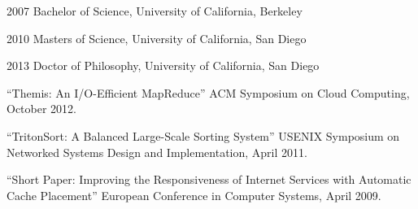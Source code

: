 \begin{vita}
\noindent
\begin{cv}{}
\begin{cvlist}{}
\item[2007] Bachelor of Science, University of California, Berkeley
\item[2010] Masters of Science, University of California, San Diego
\item[2013] Doctor of Philosophy, University of California, San Diego
\end{cvlist}
\end{cv}

\publications
\noindent``Themis: An I/O-Efficient MapReduce'' ACM Symposium on Cloud
Computing, October 2012.

\noindent``TritonSort: A Balanced Large-Scale Sorting System'' USENIX Symposium
on Networked Systems Design and Implementation, April 2011.

\noindent``Short Paper: Improving the Responsiveness of Internet Services with
Automatic Cache Placement'' European Conference in Computer Systems, April 2009.

\end{vita}
